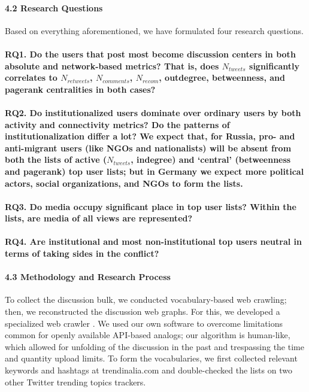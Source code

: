 \paragraph{4.2 Research Questions} 

Based on everything aforementioned, we have formulated four research questions.

\paragraph{RQ1. Do the users that post most become discussion centers in both absolute and network-based metrics? That is, does \(N_{tweets}\) significantly correlates to \(N_{retweets}\), \(N_{comments}\), \(N_{recom}\), outdegree, betweenness, and pagerank centralities in both cases?}

\paragraph{RQ2. Do institutionalized users dominate over ordinary users by both activity and connectivity metrics? Do the patterns of institutionalization differ a lot? We expect that, for Russia, pro- and anti-migrant users (like NGOs and nationalists) will be absent from both the lists of active (\(N_{tweets}\), indegree) and ‘central’ (betweenness and pagerank) top user lists; but in Germany we expect more political actors, social organizations, and NGOs to form the lists.}

\paragraph{RQ3. Do media occupy significant place in top user lists? Within the lists, are media of all views are represented?}

\paragraph{RQ4. Are institutional and most non-institutional top users neutral in terms of taking sides in the conflict?}

\paragraph{4.3 Methodology and Research Process} 

To collect the discussion bulk, we conducted vocabulary-based web crawling; then, we reconstructed the discussion web graphs. For this, we developed a specialized web crawler \cite{BlekanovSergeevMartynenko}. We used our own software to overcome limitations common for openly available API-based analogs; our algorithm is human-like, which allowed for unfolding of the discussion in the past and trespassing the time and quantity upload limits. To form the vocabularies, we first collected relevant keywords and hashtags at trendinalia.com and double-checked the lists on two other Twitter trending topics trackers.

